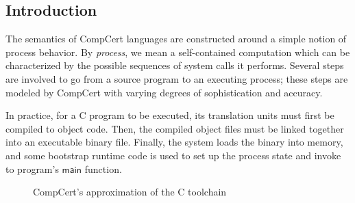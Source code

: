 \documentclass[sigplan,10pt,review,anonymous]{acmart}
\newcommand{\kw}[1]{\ensuremath{ \mathsf{#1} }}
\begin{document}
\subsection{Introduction} %

The semantics of CompCert languages
are constructed around a simple notion of process behavior.
By \emph{process}, we mean a self-contained computation
which can be characterized by
the possible sequences of system calls it performs.
Several steps are involved to go
from a source program to an executing process;
these steps are modeled by CompCert
with varying degrees of sophistication and accuracy.

In practice,
for a C program to be executed,
its translation units must first be compiled to object code.
Then,
the compiled object files must be linked together
into an executable binary file.
Finally, the system loads the binary into memory,
and some bootstrap runtime code
is used to set up the process state
and invoke to program's \kw{main} function.

\begin{figure} %
    \caption{CompCert's approximation of the C toolchain}
    \label{fig:process}
\end{figure}
\end{document}

